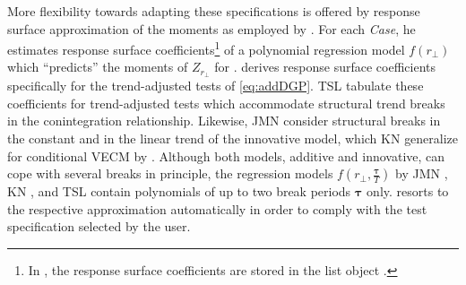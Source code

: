 More flexibility towards adapting these specifications is offered by response surface approximation of the moments as employed by \citet{Doornik1998}. For each \textit{Case}, he estimates response surface coefficients\footnote{In , the response surface coefficients are stored in the list object .} of a polynomial regression model $ f(r_\perp) $ which ``predicts'' the moments of $ Z_{r_\perp} $ for \citet{Johansen1996}. \citet{Trenkler2008} derives response surface coefficients specifically for the trend-adjusted tests of \eqref{eq:addDGP}. TSL \citeyearpar{TrenklerEtAl2008} tabulate these coefficients for trend-adjusted tests which accommodate structural trend breaks in the conintegration relationship. Likewise, JMN \citeyearpar{JohansenEtAl2000} consider structural breaks in the constant and in the linear trend of the innovative model, which KN \citeyearpar{KuritaNielsen2019} generalize for conditional VECM by \citet[Ch.~9]{Doornik1998}. Although both models, additive and innovative, can cope with several breaks in principle, the regression models $ f \left(r_\perp, \frac{\boldsymbol{\tau}}{T} \right) $ by JMN \citeyearpar{JohansenEtAl2000}, KN \citeyearpar{KuritaNielsen2019}, and TSL \citeyearpar{TrenklerEtAl2008} contain polynomials of up to two break periods $ \boldsymbol{\tau} $ only.  resorts to the respective approximation automatically in order to comply with the test specification selected by the user.



